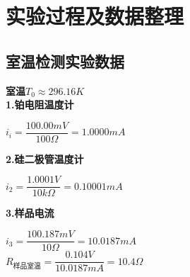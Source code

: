 \documentclass[UTF8]{ctexart}
\begin{document}
	\section{实验过程及数据整理}
	\subsection{室温检测实验数据}
	\textbf{室温$T_{0}\approx296.16K$}\\
	
	\textbf{1.铂电阻温度计}
	\begin{center}
		$i_{i}=\dfrac{100.00mV}{100\Omega}=1.0000mA$
	\end{center}
	\par \textbf{2.硅二极管温度计}
	\begin{center}
		$i_{2}=\dfrac{1.0001V}{10k\Omega}=0.10001mA$
	\end{center}
	\par \textbf{3.样品电流}
	\begin{center}
		$i_{3}=\dfrac{100.187mV}{10\Omega}=10.0187mA$\\
		$R_{\text{样品室温}}=\dfrac{0.104V}{10.0187mA}=10.4\Omega$
	\end{center}
\end{document}
